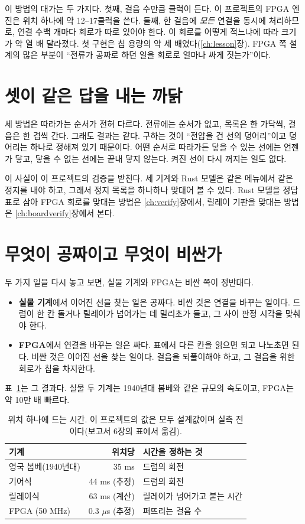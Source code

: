 \Ours 이 방법의 대가는 두 가지다. 첫째, 걸음 수만큼 클럭이 든다. 이 프로젝트의 FPGA 엔진은 위치 하나에 약 12--17클럭을
쓴다. 둘째, 한 걸음에 \emph{모든} 연결을 동시에 처리하므로, 연결 수백 개마다 회로가 따로 있어야 한다. 이 회로를 어떻게
적느냐에 따라 크기가 약 열 배 달라졌다. 첫 구현은 칩 용량의 약 세 배였다(\ref{ch:lesson}장). FPGA 쪽 설계의 많은
부분이 ``전류가 공짜로 하던 일을 회로로 얼마나 싸게 짓는가''이다.

\section{셋이 같은 답을 내는 까닭}\label{sec:f-same}

세 방법은 따라가는 순서가 전혀 다르다. 전류에는 순서가 없고, 목록은 한 가닥씩, 걸음은 한 겹씩 간다. 그래도 결과는
같다. 구하는 것이 ``전압을 건 선의 덩어리''이고 덩어리는 하나로 정해져 있기 때문이다. 어떤 순서로 따라가든 닿을 수
있는 선에는 언젠가 닿고, 닿을 수 없는 선에는 끝내 닿지 않는다. 켜진 선이 다시 꺼지는 일도 없다.

이 사실이 이 프로젝트의 검증을 받친다. 세 기계와 Rust 모델은 같은 메뉴에서 같은 정지를 내야 하고, 그래서 정지
목록을 하나하나 맞대어 볼 수 있다. Rust 모델을 정답표로 삼아 FPGA 회로를 맞대는 방법은 \ref{ch:verify}장에서, 릴레이
기판을 맞대는 방법은 \ref{ch:boardverify}장에서 본다.

\section{무엇이 공짜이고 무엇이 비싼가}\label{sec:f-cost}

두 가지 일을 다시 놓고 보면, 실물 기계와 FPGA는 비싼 쪽이 정반대다.

\begin{itemize}
\item \textbf{실물 기계}에서 이어진 선을 찾는 일은 공짜다. 비싼 것은 연결을 바꾸는 일이다. 드럼이 한 칸 돌거나
릴레이가 넘어가는 데 밀리초가 들고, 그 사이 판정 시각을 맞춰야 한다.
\item \textbf{FPGA}에서 연결을 바꾸는 일은 싸다. 표에서 다른 칸을 읽으면 되고 나노초면 된다. 비싼 것은 이어진 선을
찾는 일이다. 걸음을 되풀이해야 하고, 그 걸음을 위한 회로가 칩을 차지한다.
\end{itemize}

표~\ref{tab:f-speed}는 그 결과다. 실물 두 기계는 1940년대 봄베와 같은 규모의 속도이고, FPGA는 약 10만 배 빠르다.

\begin{table}[ht]
\centering
\caption{위치 하나에 드는 시간. 이 프로젝트의 값은 모두 설계값이며 실측 전이다(보고서 6장의 표에서 옮김).}
\label{tab:f-speed}
\small
\begin{tabular}{l r l}
\toprule
기계 & 위치당 & 시간을 정하는 것 \\
\midrule
영국 봄베(1940년대) & 35 ms & 드럼의 회전 \\
기어식 & 44 ms (추정) & 드럼의 회전 \\
릴레이식 & 63 ms (계산) & 릴레이가 넘어가고 붙는 시간 \\
FPGA (50 MHz) & 0.3 $\mu$s (추정) & 퍼뜨리는 걸음 수 \\
\bottomrule
\end{tabular}
\end{table}

